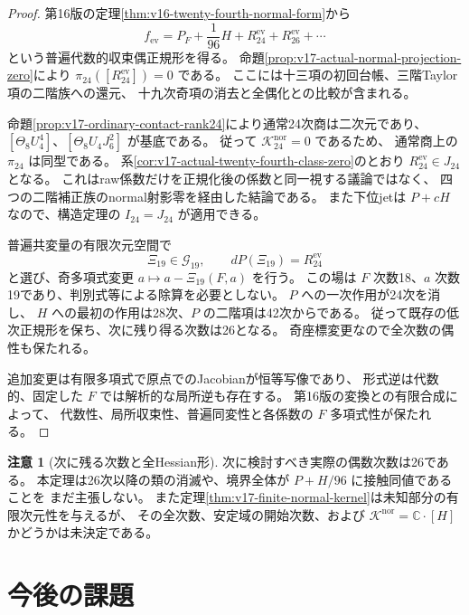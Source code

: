 \documentclass[a4paper,11pt]{ltjsarticle}
\theoremstyle{definition}
\newtheorem{remark}[theorem]{注意}
\begin{document}
\begin{proof}
第16版の定理\ref{thm:v16-twenty-fourth-normal-form}から
\[
 f_{\mathrm{ev}}=P_F+\frac1{96}H+R_{24}^{\mathrm{ev}}
                                      +R_{26}^{\mathrm{ev}}+\cdots
\]
という普遍代数的収束偶正規形を得る。
命題\ref{prop:v17-actual-normal-projection-zero}により
$\pi_{24}([R_{24}^{\mathrm{ev}}])=0$ である。
ここには十三項の初回台帳、三階Taylor項の二階族への還元、
十九次奇項の消去と全偶化との比較が含まれる。

命題\ref{prop:v17-ordinary-contact-rank24}により通常24次商は二次元であり、
$[\Theta_8U_4^4]$、$[\Theta_8U_4J_6^2]$ が基底である。
従って $\mathcal K_{24}^{\mathrm{nor}}=0$ であるため、
通常商上の $\pi_{24}$ は同型である。
系\ref{cor:v17-actual-twenty-fourth-class-zero}のとおり
$R_{24}^{\mathrm{ev}}\in J_{24}$ となる。
これはraw係数だけを正規化後の係数と同一視する議論ではなく、
四つの二階補正族のnormal射影零を経由した結論である。
また下位jetは $P+cH$ なので、構造定理の $I_{24}=J_{24}$ が適用できる。

普遍共変量の有限次元空間で
\[
 \Xi_{19}\in\mathcal G_{19},\qquad dP(\Xi_{19})=R_{24}^{\mathrm{ev}}
\]
と選び、奇多項式変更 $a\mapsto a-\Xi_{19}(F,a)$ を行う。
この場は $F$ 次数18、$a$ 次数19であり、判別式等による除算を必要としない。
$P$ への一次作用が24次を消し、
$H$ への最初の作用は28次、$P$ の二階項は42次からである。
従って既存の低次正規形を保ち、次に残り得る次数は26となる。
奇座標変更なので全次数の偶性も保たれる。

追加変更は有限多項式で原点でのJacobianが恒等写像であり、
形式逆は代数的、固定した $F$ では解析的な局所逆も存在する。
第16版の変換との有限合成によって、
代数性、局所収束性、普遍同変性と各係数の $F$ 多項式性が保たれる。
\end{proof}

\begin{remark}[次に残る次数と全Hessian形]
次に検討すべき実際の偶数次数は26である。
本定理は26次以降の類の消滅や、境界全体が $P+H/96$ に接触同値であることを
まだ主張しない。
また定理\ref{thm:v17-finite-normal-kernel}は未知部分の有限次元性を与えるが、
その全次数、安定域の開始次数、および
$\mathcal K^{\mathrm{nor}}=\mathbb C\cdot[H]$ かどうかは未決定である。
\end{remark}


\clearpage
\section{今後の課題}
\end{document}
